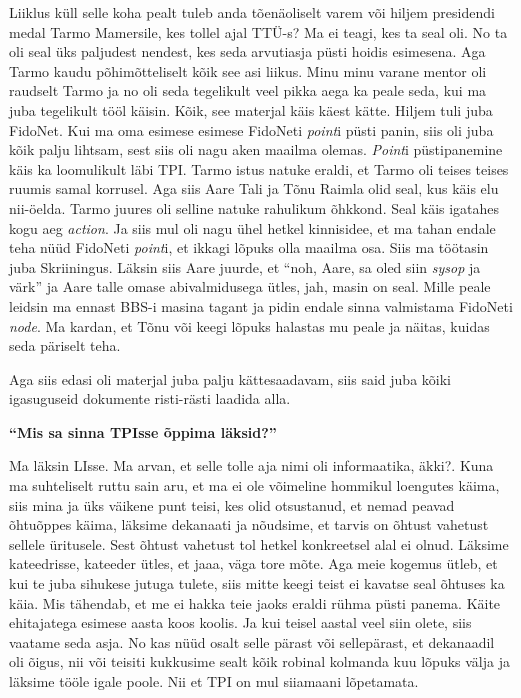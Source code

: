 Liiklus küll selle koha pealt tuleb anda tõenäoliselt varem või hiljem 
presidendi medal Tarmo Mamersile, kes tollel ajal 
TTÜ-s? Ma ei teagi, kes ta seal oli. No ta oli 
seal üks paljudest nendest, kes seda arvutiasja püsti hoidis esimesena. Aga 
Tarmo kaudu põhimõtteliselt kõik see asi liikus. Minu minu varane mentor oli 
raudselt Tarmo ja no oli seda tegelikult veel pikka aega ka peale seda, kui ma 
juba tegelikult tööl käisin. Kõik, see materjal käis käest kätte. Hiljem tuli 
juba FidoNet. Kui ma oma esimese esimese FidoNeti \emph{point}i 
püsti panin, siis oli juba kõik palju lihtsam, sest siis oli nagu aken maailma 
olemas. \emph{Point}i püstipanemine käis ka loomulikult läbi TPI. Tarmo 
istus natuke eraldi, et Tarmo oli teises teises ruumis samal korrusel. Aga siis 
Aare Tali\label{sisu!aare_tali} ja Tõnu Raimla olid 
seal, kus käis elu nii-öelda.  Tarmo juures oli selline natuke rahulikum 
õhkkond. Seal käis igatahes kogu aeg \emph{action}. Ja siis mul oli nagu ühel 
hetkel kinnisidee, et ma tahan endale teha nüüd FidoNeti \emph{point}i, et 
ikkagi lõpuks olla maailma osa. Siis ma töötasin juba 
Skriiningus. Läksin siis Aare juurde, et \enquote{noh, Aare, 
sa oled siin \emph{sysop} ja värk} ja Aare talle omase abivalmidusega ütles, 
jah, masin on seal. Mille peale leidsin ma ennast BBS-i masina tagant ja pidin 
endale sinna valmistama FidoNeti \emph{node}. Ma kardan, et Tõnu või keegi 
lõpuks halastas mu peale ja näitas, kuidas seda päriselt teha. 

Aga siis edasi oli materjal juba palju kättesaadavam, siis said juba kõiki 
igasuguseid dokumente risti-rästi laadida alla. 

\textbf{\enquote{Mis sa sinna TPIsse õppima läksid?}}

Ma läksin LIsse. Ma arvan, et selle tolle aja nimi oli informaatika, äkki?. 
Kuna ma suhteliselt ruttu sain aru, et ma ei ole võimeline hommikul loengutes 
käima, siis mina ja üks väikene punt teisi, kes olid otsustanud, et nemad 
peavad õhtuõppes käima, läksime dekanaati ja nõudsime, et tarvis on õhtust 
vahetust sellele üritusele. Sest  õhtust vahetust tol hetkel konkreetsel alal 
ei olnud. Läksime kateedrisse, kateeder ütles, et jaaa, väga tore mõte. Aga 
meie kogemus ütleb, et kui te juba sihukese jutuga tulete, siis mitte keegi 
teist ei kavatse seal õhtuses ka käia. Mis tähendab, et me ei hakka teie jaoks  
eraldi rühma püsti panema. Käite ehitajatega esimese aasta koos koolis. Ja kui 
teisel aastal veel siin olete, siis vaatame seda asja. No kas nüüd osalt selle 
pärast või sellepärast, et dekanaadil oli õigus, nii või teisiti kukkusime 
sealt kõik robinal kolmanda kuu lõpuks välja ja läksime tööle igale poole. Nii 
et TPI on mul siiamaani lõpetamata. 

